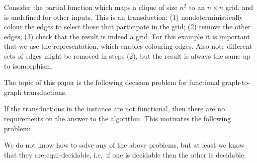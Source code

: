 \begin{example}
    Consider the partial function which maps a clique of size $n^2$ to an $n\times n$ grid, and is undefined for other inputs.  This is an \mso transduction: (1) nondeterministically colour the edges to select those that participate in the grid; (2) remove the other edges; (3) check that the result is indeed a grid. For this example it is important that we use the \msotwo representation, which enables colouring edges.  Also note  different sets of edges might be removed in steps (2), but the result is always the same up to isomorphism.
\end{example}    

The topic of this paper is   the following  decision problem for functional \mso graph-to-graph transductions. 



If the  transductions in the instance are not functional, then there are no requirements on the answer to the algorithm. This motivates the following problem:

    
We do not know how to solve any of the above problems, but at least we know that they are equi-decidable, i.e.~if one is decidable then the other is decidable. 

